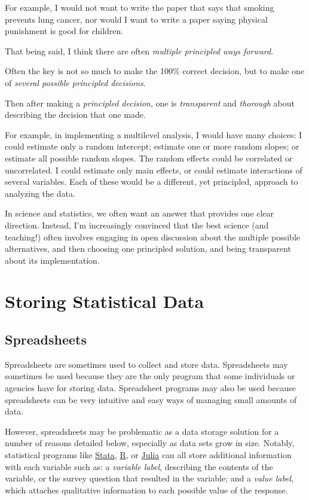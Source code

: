 \documentclass[
  letterpaper,
  DIV=11,
  numbers=noendperiod]{scrreprt}
\begin{document}
For example, I would not want to write the paper that says that smoking
prevents lung cancer, nor would I want to write a paper saying physical
punishment is good for children.

That being said, I think there are often \emph{multiple principled ways
forward}.

Often the key is not so much to make the 100\% correct decision, but to
make one of \emph{several possible principled decisions}.

Then after making a \emph{principled decision}, one is
\emph{transparent} and \emph{thorough} about describing the decision
that one made.

For example, in implementing a multilevel analysis, I would have many
choices: I could estimate only a random intercept; estimate one or more
random slopes; or estimate all possible random slopes. The random
effects could be correlated or uncorrelated. I could estimate only main
effects, or could estimate interactions of several variables. Each of
these would be a different, yet principled, approach to analyzing the
data.

In science and statistics, we often want an answer that provides one
clear direction. Instead, I'm increasingly convinced that the best
science (and teaching!) often involves engaging in open discussion about
the multiple possible alternatives, and then choosing one principled
solution, and being transparent about its implementation.


\chapter{Storing Statistical Data}\label{storing-statistical-data}

\section{Spreadsheets}\label{spreadsheets}

Spreadsheets are sometimes used to collect and store data. Spreadsheets
may sometimes be used because they are the only program that some
individuals or agencies have for storing data. Spreadsheet programs may
also be used because spreadsheets can be very intuitive and easy ways of
managing small amounts of data.

However, spreadsheets may be problematic as a data storage solution for
a number of reasons detailed below, especially as data sets grow in
size. Notably, statistical programs like
\href{https://www.stata.com/}{Stata},
\href{https://www.r-project.org/}{R}, or
\href{https://julialang.org/}{Julia} can all store additional
information with each variable such as: a \emph{variable label},
describing the contents of the variable, or the survey question that
resulted in the variable; and a \emph{value label}, which attaches
qualitative information to each possible value of the response.
\end{document}
